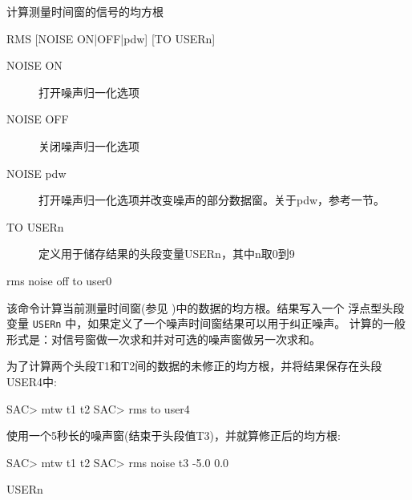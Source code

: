 \label{cmd:rms}

计算测量时间窗的信号的均方根

\begin{SACSTX}
RMS [NOISE ON|OFF|pdw] [TO USERn]
\end{SACSTX}

\begin{description}
\item [NOISE ON] 打开噪声归一化选项
\item [NOISE OFF] 关闭噪声归一化选项
\item [NOISE pdw] 打开噪声归一化选项并改变噪声的部分数据窗。关于pdw，参考一节。
\item [TO USERn] 定义用于储存结果的头段变量USERn，其中n取0到9
\end{description}

\begin{SACDFT}
rms noise off to user0
\end{SACDFT}

该命令计算当前测量时间窗(参见 )中的数据的均方根。结果写入一个
浮点型头段变量 \texttt{USERn} 中，如果定义了一个噪声时间窗结果可以用于纠正噪声。
计算的一般形式是：对信号窗做一次求和并对可选的噪声窗做另一次求和。

为了计算两个头段T1和T2间的数据的未修正的均方根，并将结果保存在头段USER4中:
\begin{SACCode}
SAC> mtw t1 t2
SAC> rms to user4
\end{SACCode}

使用一个5秒长的噪声窗(结束于头段值T3)，并就算修正后的均方根:
\begin{SACCode}
SAC> mtw t1 t2
SAC> rms noise t3 -5.0 0.0
\end{SACCode}

USERn
